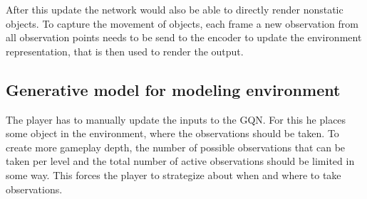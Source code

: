 After this update the network would also be able to directly render nonstatic objects. To capture the movement of objects, each frame a new observation from all observation points needs to be send to the encoder to update the environment representation, that is then used to render the output.


\subsection{Generative model for modeling environment}
The player has to manually update the inputs to the GQN. For this he places some object in the environment, where the observations should be taken. To create more gameplay depth, the number of possible observations that can be taken per level and the total number of active observations should be limited in some way. This forces the player to strategize about when and where to take observations.

